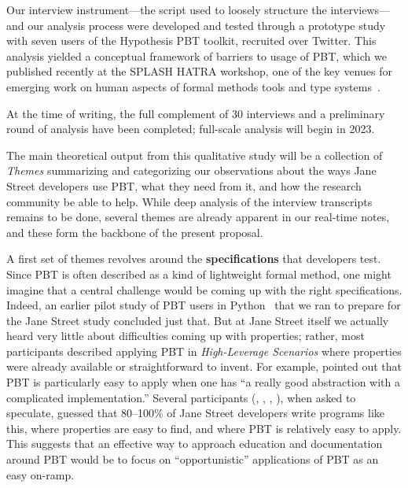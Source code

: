 Our interview instrument---the script used to loosely
structure the interviews---and our analysis process were developed and
tested through a prototype study with seven users of the Hypothesis
PBT toolkit, recruited over Twitter.  This analysis yielded a
conceptual framework of barriers to usage of PBT, which we published
recently at the SPLASH HATRA workshop, one of the key venues for
emerging work on human aspects of formal methods tools and type
systems~\cite{goldstein2022some}.

At the time of writing, the full
complement of 30 interviews and a preliminary round of analysis have
been completed; full-scale analysis will begin in 2023.

 The main theoretical output from
this qualitative study will be a collection of {\em Themes} summarizing
and categorizing our observations about the ways Jane Street developers
use PBT, what they need from it, and how the research community be
able to help.  While deep analysis of the interview transcripts remains
to be done, several themes are already apparent in our real-time
notes, and these form the backbone of the present proposal.

\newcommand{\proptheme}[1]{{\color{nord-orange} \em #1}}
\newcommand{\gentheme}[1]{{\color{nord-green} \em #1}}
\newcommand{\evaltheme}[1]{{\color{nord-purple} \em #1}}
A first set of
themes revolves around the {\bf specifications} that developers test.
Since
PBT is often described as a kind of lightweight formal method, one
might imagine that a central challenge would be coming up with the
right specifications. Indeed, an earlier pilot study of PBT users in
Python~\cite{goldstein_problems_2022} that we ran to prepare for the Jane Street
study\iflater{}\fi{}
concluded just that.
  But at Jane Street itself
we actually heard very little about difficulties coming up with
properties; rather, most participants described applying PBT in
\proptheme{High-Leverage Scenarios} where properties were already
available or straightforward to invent. For example,  pointed out
that PBT is particularly easy to apply when one has ``a really good abstraction
with a complicated implementation.''
Several participants (, ,
, ), when asked to speculate, guessed
that 80--100\% of Jane Street
developers write programs like this, where properties are easy to find, and
where PBT is relatively easy to apply.  This suggests that an effective way to
approach education and documentation around PBT would be to focus on
``opportunistic'' applications of PBT as an easy on-ramp.

